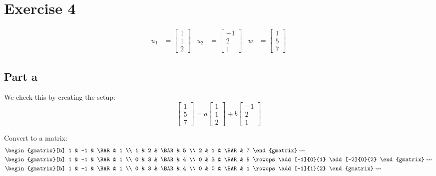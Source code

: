 \section{Exercise 4}
\begin{align*}
	u_1 & = \begin{bmatrix}1\\1\\2\end{bmatrix}  &
	u_2 & = \begin{bmatrix}-1\\2\\1\end{bmatrix} &
	w   & = \begin{bmatrix}1\\5\\7\end{bmatrix}
\end{align*}

\subsection{Part a}

We check this by creating the setup:
\[
	\begin{bmatrix}
		1 \\5\\7
	\end{bmatrix} = a\begin{bmatrix}
		1 \\1\\2
	\end{bmatrix} + b\begin{bmatrix}
		-1 \\2\\1
	\end{bmatrix}
\]

Convert to a matrix:
\begin{align*}
	 & \begin{gmatrix}[b]
		   1 & -1 & \BAR & 1 \\
		   1 & 2  & \BAR & 5 \\
		   2 & 1  & \BAR & 7
	   \end{gmatrix} \rightsquigarrow \\
	 & \begin{gmatrix}[b]
		   1 & -1 & \BAR & 1 \\
		   0 & 3  & \BAR & 4 \\
		   0 & 3  & \BAR & 5
		   \rowops
		   \add[-1]{0}{1}
		   \add[-2]{0}{2}
	   \end{gmatrix} \rightsquigarrow \\
	 & \begin{gmatrix}[b]
		   1 & -1 & \BAR & 1 \\
		   0 & 3  & \BAR & 4 \\
		   0 & 0  & \BAR & 1
		   \rowops
		   \add[-1]{1}{2}
	   \end{gmatrix} \rightsquigarrow \\
\end{align*}


